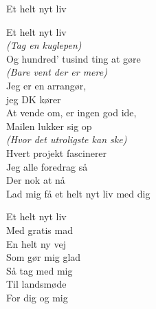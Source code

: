 \begin{song}{Et helt nyt liv}
  \begin{SBChorus}
    Et helt nyt liv\\
    \emph{(Tag en kuglepen)}\\
    Og hundred' tusind ting at gøre\\
    \emph{(Bare vent der er mere)}\\
    Jeg er en arrangør,\\
    jeg DK kører\\
    At vende om, er ingen god ide,\\
    Mailen lukker sig op\\
    \emph{(Hvor det utroligste kan ske)}\\
    Hvert projekt fascinerer\\
    \medskip
    Jeg alle foredrag så\\
    Der nok at nå\\
    Lad mig få et helt nyt liv med dig
  \end{SBChorus}

  \begin{SBSection*}
    Et helt nyt liv\\
    Med gratis mad\\
    En helt ny vej\\
    Som gør mig glad\\
    Så tag med mig\\
    Til landsmøde\\
    For dig og mig
  \end{SBSection*}
\end{song}